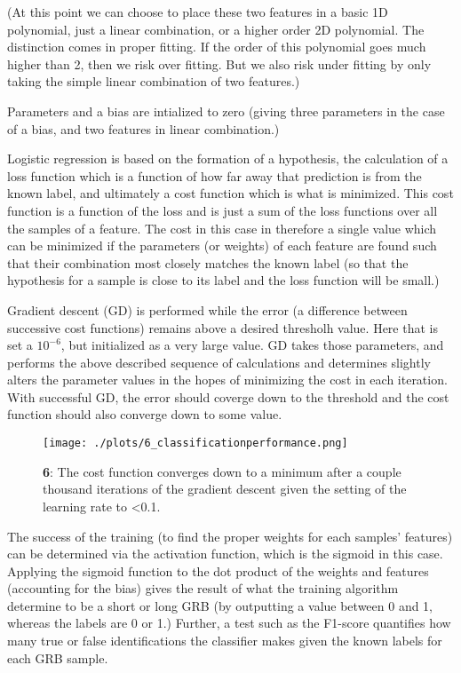 (At this point we can choose to place these two features in a basic 1D polynomial, just a linear combination, or a higher order 2D polynomial. The distinction comes in proper fitting. If the order of this polynomial goes much higher than 2, then we risk over fitting. But we also risk under fitting by only taking the simple linear combination of two features.)

Parameters and a bias are intialized to zero (giving three parameters in the case of a bias, and two features in linear combination.)

Logistic regression is based on the formation of a hypothesis, the calculation of a loss function which is a function of how far away that prediction is from the known label, and ultimately a cost function which is what is minimized. This cost function is a function of the loss and is just a sum of the loss functions over all the samples of a feature. The cost in this case in therefore a single value which can be minimized if the parameters (or weights) of each feature are found such that their combination most closely matches the known label (so that the hypothesis for a sample is close to its label and the loss function will be small.)

Gradient descent (GD) is performed while the error (a difference between successive cost functions) remains above a desired thresholh value. Here that is set a $10^{-6}$, but initialized as a very large value. GD takes those parameters, and performs the above described sequence of calculations and determines slightly alters the parameter values in the hopes of minimizing the cost in each iteration. With successful GD, the error should coverge down to the threshold and the cost function should also converge down to some value.

\begin{figure}[h!]
  \centering
  \texttt{[image: ./plots/6\_classificationperformance.png]}
  \caption{\textbf{6}: The cost function converges down to a minimum after a couple thousand iterations of the gradient descent given the setting of the learning rate to <0.1.}
  \label{fig:classificationperformance}
\end{figure}

The success of the training (to find the proper weights for each samples' features) can be determined via the activation function, which is the sigmoid in this case. Applying the sigmoid function to the dot product of the weights and features (accounting for the bias) gives the result of what the training algorithm determine to be a short or long GRB (by outputting a value between 0 and 1, whereas the labels are 0 or 1.) Further, a test such as the F1-score quantifies how many true or false identifications the classifier makes given the known labels for each GRB sample.

